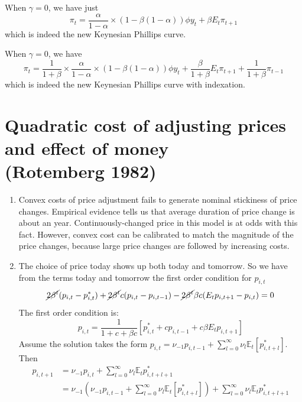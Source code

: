 \documentclass[11pt]{amsart}
\begin{document}
When $\gamma = 0$, we have just
\[
\pi_t =  \frac{\alpha}{1-\alpha} \times (1 - \beta (1-\alpha)) \phi  y_t +  \beta E_t \pi_{t+1} 
\]
which is indeed the new Keynesian Phillips curve.

When $\gamma = 0$, we have 
\[
\pi_t = \frac{1}{1 + \beta}  \times \frac{\alpha}{1-\alpha} \times (1 - \beta (1-\alpha)) \phi y_t + \frac{\beta}{1 + \beta}E_t \pi_{t+1} +  \frac{1}{1 + \beta} \pi_{t-1}
\]
which is indeed the new Keynesian Phillips curve with indexation.

\section{Quadratic cost of adjusting prices and effect of money \\ (Rotemberg 1982)}
\begin{enumerate}[label = (\alph*)]
	\item Convex costs of price adjustment fails to generate nominal stickiness of price changes. 
	Empirical evidence tells us that average duration of price change is about an year. 
	Continuously-changed price in this model is at odds with this fact. 
	However, convex cost can be calibrated to match the magnitude of the price changes, because large price changes are followed by increasing costs.

	\item 
	The choice of price today shows up both today and tomorrow. 
	So we have from the terms today and tomorrow the first order condition for $p_{i,t}$
	\[
	\cancel{2 \beta^t} (p_{i,t} - p_{i,t}^*) + \cancel{2 \beta^t} c (p_{i,t} - p_{i,t-1}) - \cancel{2 \beta^t} \beta c (E_t p_{i,t+1} - p_{i,t}) = 0
	\]
	The first order condition is: 
	\begin{equation*}
    p_{i,t} = \frac{1}{1 + c + \beta c} \left[ p_{i,t}^{*} + c p_{i,t-1} + c \beta E_t p_{i,t+1} \right]
	\end{equation*}
	Assume the solution takes the form $p_{i,t} = \nu_{-1} p_{i,t-1} + \sum_{l=0}^{\infty}\nu_l \mathbb{E}_t [p_{i,t+l}^{*}]$.
	Then
	\begin{align*}
	p_{i,t+1} &= \nu_{-1} p_{i,t} + \sum_{l=0}^{\infty} \nu_l \mathbb{E}_t p_{i,t+l+1}^{*} \\
	& = \nu_{-1} \left( \nu_{-1} p_{i,t-1} + \sum_{l=0}^{\infty}\nu_l \mathbb{E}_t [p_{i,t+l}^{*}] \right)+ \sum_{l=0}^{\infty} \nu_l \mathbb{E}_t p_{i,t+l+1}^{*}
	\end{align*}
	

\end{enumerate}
\end{document}
